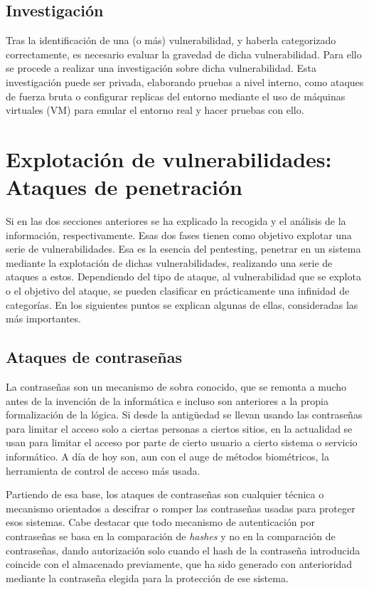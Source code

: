 \subsection{Investigación}

Tras la identificación de una (o más) vulnerabilidad, y haberla categorizado correctamente, es necesario evaluar la gravedad de dicha vulnerabilidad. Para ello se procede a realizar una investigación sobre dicha vulnerabilidad. Esta investigación puede ser privada, elaborando pruebas a nivel interno, como ataques de fuerza bruta o configurar replicas del entorno mediante el uso de máquinas virtuales (VM) para emular el entorno real y hacer pruebas con ello.

\section[Explotación de vulnerabilidades]{Explotación de vulnerabilidades: Ataques de penetración}

Si en las dos secciones anteriores se ha explicado la recogida y el análisis de la información, respectivamente. Esas dos fases tienen como objetivo explotar una serie de vulnerabilidades. Esa es la esencia del pentesting, penetrar en un sistema mediante la explotación de dichas vulnerabilidades, realizando una serie de ataques a estos. Dependiendo del tipo de ataque, al vulnerabilidad que se explota o el objetivo del ataque, se pueden clasificar en prácticamente una infinidad de categorías. En los siguientes puntos se explican algunas de ellas, consideradas las más importantes.

\subsection{Ataques de contraseñas}
La contraseñas son un mecanismo de sobra conocido, que se remonta a mucho antes de la invención de la informática e incluso son anteriores a la propia formalización de la lógica. Si desde la antigüedad se llevan usando las contraseñas para limitar el acceso solo a ciertas personas a ciertos sitios, en la actualidad se usan para limitar el acceso por parte de cierto usuario a cierto sistema o servicio informático. A día de hoy son, aun con el auge de métodos biométricos, la herramienta de control de acceso más usada.

Partiendo de esa base, los ataques de contraseñas son cualquier técnica o mecanismo orientados a descifrar o romper las contraseñas usadas para proteger esos sistemas. Cabe destacar que todo mecanismo de autenticación por contraseñas se basa en la comparación de \emph{hashes} y no en la comparación de contraseñas, dando autorización solo cuando el hash de la contraseña introducida coincide con el almacenado previamente, que ha sido generado con anterioridad mediante la contraseña elegida para la protección de ese sistema.

